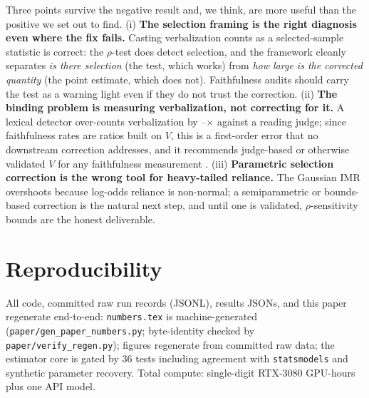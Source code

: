 \documentclass[10pt]{article}
\begin{document}
Three points survive the negative result and, we think, are more useful than
the positive we set out to find. (i) \textbf{The selection framing is the right
diagnosis even where the fix fails.} Casting verbalization counts as a
selected-sample statistic is correct: the $\rho$-test does detect selection,
and the framework cleanly separates \emph{is there selection} (the test, which
works) from \emph{how large is the corrected quantity} (the point estimate,
which does not). Faithfulness audits should carry the test as a warning light
even if they do not trust the correction. (ii) \textbf{The binding problem is
measuring verbalization, not correcting for it.} A lexical detector over-counts
verbalization by \QNeOvercount--\QQwOvercount$\times$ against a reading judge;
since faithfulness rates are ratios built on $V$, this is a first-order error
that no downstream correction addresses, and it recommends judge-based or
otherwise validated $V$ for any faithfulness measurement
\citep{young2026measuring}. (iii) \textbf{Parametric selection correction is
the wrong tool for heavy-tailed reliance.} The Gaussian IMR overshoots because
log-odds reliance is non-normal; a semiparametric or bounds-based correction is
the natural next step, and until one is validated, $\rho$-sensitivity bounds
are the honest deliverable.

\section{Reproducibility}

All code, committed raw run records (JSONL), results JSONs, and this paper
regenerate end-to-end: \texttt{numbers.tex} is machine-generated
(\texttt{paper/gen\_paper\_numbers.py}; byte-identity checked by
\texttt{paper/verify\_regen.py}); figures regenerate from committed raw
data; the estimator core is gated by 36 tests including agreement with
\texttt{statsmodels} and synthetic parameter recovery. Total compute:
single-digit RTX-3080 GPU-hours plus one API model.



\end{document}
